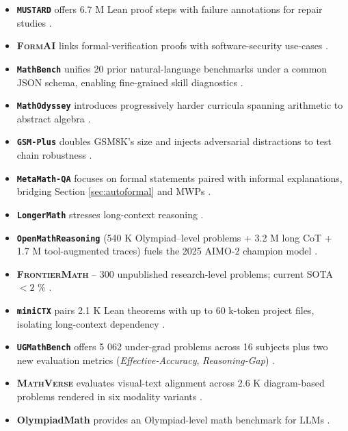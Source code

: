 \documentclass[acmsmall,anonymous]{acmart}
\begin{document}
\begin{itemize}
    \item \textbf{\texttt{MUSTARD}} offers 6.7 M Lean proof steps with failure annotations for repair studies \cite{huang2024mustard}. 
    \item \textbf{\textsc{FormAI}} links formal-verification proofs with software-security use-cases \cite{johnson2024formai}.
    \item \textbf{\texttt{MathBench}} unifies 20 prior natural-language benchmarks under a common JSON schema, enabling fine-grained skill diagnostics \cite{yang2024mathbench}.  
    \item \textbf{\texttt{MathOdyssey}} introduces progressively harder curricula spanning arithmetic to abstract algebra \cite{zhang2024mathodyssey,zhang2024mathodyssey}.  
    \item \textbf{\texttt{GSM-Plus}} doubles GSM8K’s size and injects adversarial distractions to test chain robustness \cite{li2024gsmplus}.  
    \item \textbf{\texttt{MetaMath-QA}} focuses on formal statements paired with informal explanations, bridging Section \ref{sec:autoformal} and MWPs \cite{metamath2024,yu2024metamath}.
    \item \textbf{\texttt{LongerMath}} stresses long-context reasoning \cite{liu2024llmslongermath}.
    \item \textbf{\texttt{OpenMathReasoning}} (540 K Olympiad–level problems + 3.2 M long CoT + 1.7 M tool-augmented traces) fuels the 2025 AIMO-2 champion model \cite{Moshkov2025OpenMath}.
    \item \textbf{\textsc{FrontierMath}} – 300 unpublished research-level problems; current SOTA $<2$ \% \cite{Glazer2025FrontierMath}.
    \item \textbf{\texttt{miniCTX}} pairs 2.1 K Lean theorems with up to 60 k-token project files, isolating long-context dependency \cite{Hu2025miniCTX}.
    \item \textbf{\texttt{UGMathBench}} offers 5 062 under-grad problems across 16 subjects plus two new evaluation metrics (\textit{Effective-Accuracy}, \textit{Reasoning-Gap}) \cite{Xu2025UGMathBench}.
    \item \textbf{\textsc{MathVerse}} evaluates visual-text alignment across 2.6 K diagram-based problems rendered in six modality variants \cite{zhang2024mathverse}.
    \item \textbf{OlympiadMath} provides an Olympiad-level math benchmark for LLMs \cite{anonymous2025olympiadmath,anonymous2025olympiadmath}.

\end{itemize}
\end{document}
